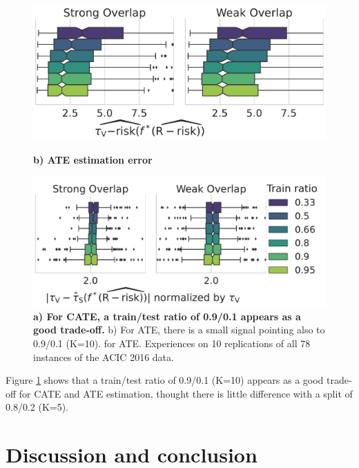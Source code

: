 \documentclass[10pt]{article}
\begin{document}
\begin{multicols}{2}
\begin{figure}[!t]
\begin{minipage}{.5\textwidth}
            \includegraphics[height=.35\textwidth]{images/_5_train_size_evaluated_metric_r_risk__evaluation_validation_tau_risk__best_tau_norm__False_norm_False__acic16.pdf}
        \end{minipage}
        \begin{minipage}{.5\textwidth}
            \centerline{\textbf{b) ATE estimation error}}
            \includegraphics[height=.35\textwidth]{images/_5_train_size_evaluated_metric_r_risk__evaluation_validation_test_abs_bias_ate__best_tau_norm__False_norm_True__acic16.pdf}
        \end{minipage}%
        \caption{\textbf{a) For CATE, a train/test ratio of 0.9/0.1 appears as a good
                trade-off.} b) For ATE, there is a small signal pointing also to
            0.9/0.1 (K=10).
            for ATE. Experiences on 10 replications of all 78 instances of the ACIC 2016
            data.}\label{fig:train_test_ratio}
    \end{figure}

    Figure \ref{fig:train_test_ratio} shows that a train/test ratio of
    0.9/0.1 (K=10) appears as a good trade-off for CATE and ATE estimation,
    thought there is little difference with a split of 0.8/0.2 (K=5).



    \section{Discussion and conclusion}\label{sec:discussion}


\end{multicols}
\end{document}

